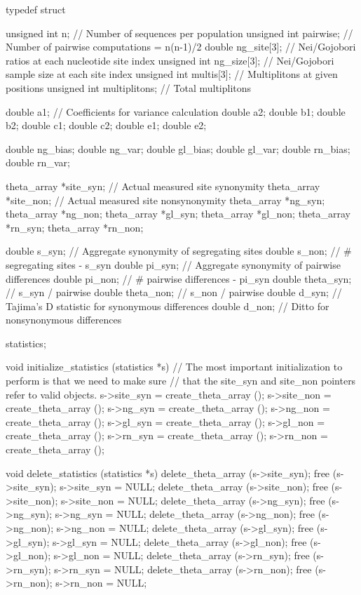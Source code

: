 \documentclass{article}
\begin{document}
\begin{ccode}
typedef struct {
  unsigned int	n;     		// Number of sequences per population
  unsigned int	pairwise;	// Number of pairwise computations = n(n-1)/2
  double	ng_site[3];	// Nei/Gojobori ratios at each nucleotide site index
  unsigned int	ng_size[3];	// Nei/Gojobori sample size at each site index
  unsigned int	multis[3];	// Multiplitons at given positions
  unsigned int	multiplitons;	// Total multiplitons

  double	a1;		// Coefficients for variance calculation
  double	a2;
  double	b1;
  double	b2;
  double	c1;
  double	c2;
  double	e1;
  double	e2;

  double	ng_bias;
  double	ng_var;
  double	gl_bias;
  double	gl_var;
  double	rn_bias;
  double	rn_var;

  theta_array 	*site_syn;	// Actual measured site synonymity
  theta_array 	*site_non;	// Actual measured site nonsynonymity
  theta_array 	*ng_syn;
  theta_array 	*ng_non;
  theta_array 	*gl_syn;
  theta_array 	*gl_non;
  theta_array 	*rn_syn;
  theta_array 	*rn_non;

  double	s_syn;		// Aggregate synonymity of segregating sites
  double	s_non;		// # segregating sites - s_syn
  double	pi_syn;		// Aggregate synonymity of pairwise differences
  double	pi_non;		// # pairwise differences - pi_syn
  double	theta_syn;	// s_syn / pairwise
  double	theta_non;	// s_non / pairwise
  double	d_syn;		// Tajima's D statistic for synonymous differences
  double	d_non;		// Ditto for nonsynonymous differences
} statistics;

void initialize_statistics (statistics *s) {
  // The most important initialization to perform is that we need to make sure
  // that the site_syn and site_non pointers refer to valid objects.
  s->site_syn = create_theta_array ();
  s->site_non = create_theta_array ();
  s->ng_syn = create_theta_array   ();
  s->ng_non = create_theta_array   ();
  s->gl_syn = create_theta_array   ();
  s->gl_non = create_theta_array   ();
  s->rn_syn = create_theta_array   ();
  s->rn_non = create_theta_array   ();
}

void delete_statistics (statistics *s) {
  delete_theta_array (s->site_syn); free (s->site_syn); s->site_syn = NULL;
  delete_theta_array (s->site_non); free (s->site_non); s->site_non = NULL;
  delete_theta_array (s->ng_syn);   free (s->ng_syn);	s->ng_syn = NULL;
  delete_theta_array (s->ng_non);   free (s->ng_non);	s->ng_non = NULL;
  delete_theta_array (s->gl_syn);   free (s->gl_syn);	s->gl_syn = NULL;
  delete_theta_array (s->gl_non);   free (s->gl_non);	s->gl_non = NULL;
  delete_theta_array (s->rn_syn);   free (s->rn_syn);	s->rn_syn = NULL;
  delete_theta_array (s->rn_non);   free (s->rn_non);	s->rn_non = NULL;
}
\end{ccode}
\end{document}
